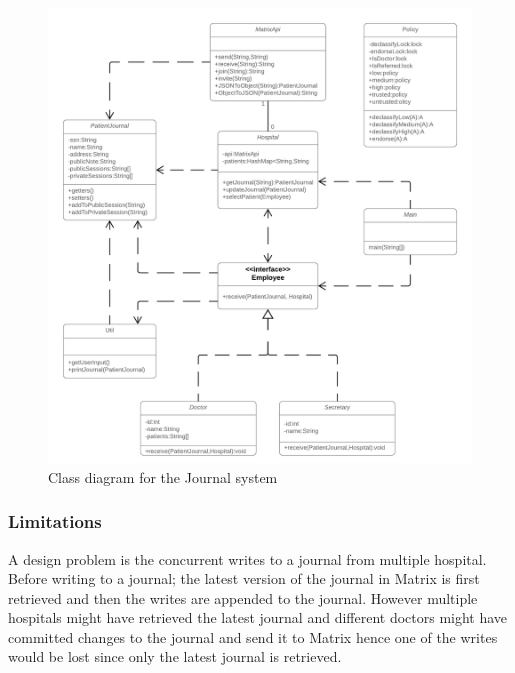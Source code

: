 \begin{figure}[H] 
	\hspace*{-1.3cm}
	\centering
	\includegraphics[width=14cm]{figures/journalsystem_class.png}
	\caption{Class diagram for the Journal system}
	\label{fig:journalsystem}
\end{figure}





\subsubsection{Limitations}



A design problem is the concurrent writes to a journal from multiple hospital. Before writing to a journal; the latest version of the journal in Matrix is first retrieved and then the writes are appended to the journal. However multiple hospitals might have retrieved the latest journal and different doctors might have committed changes to the journal and send it to Matrix hence one of the writes would be lost since only the latest journal is retrieved. 



